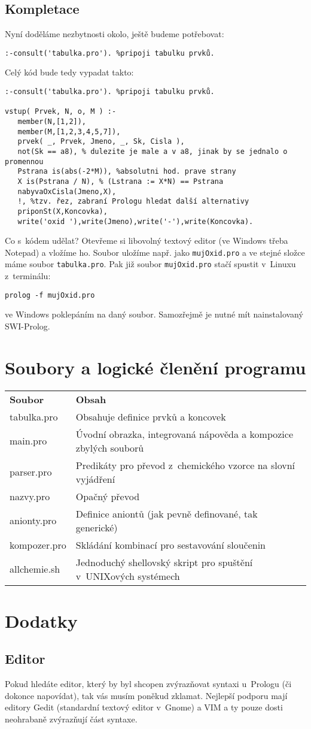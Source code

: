 \documentclass[a4paper]{article}
\begin{document}
\subsection{Kompletace}
Nyní doděláme nezbytnosti okolo, ještě budeme potřebovat:
\begin{verbatim}
:-consult('tabulka.pro'). %pripoji tabulku prvků.
\end{verbatim}
Celý kód bude tedy vypadat takto:
\begin{verbatim}
:-consult('tabulka.pro'). %pripoji tabulku prvků.

vstup( Prvek, N, o, M ) :-
   member(N,[1,2]),
   member(M,[1,2,3,4,5,7]),
   prvek( _, Prvek, Jmeno, _, Sk, Cisla ),
   not(Sk == a8), % dulezite je male a v a8, jinak by se jednalo o promennou
   Pstrana is(abs(-2*M)), %absolutni hod. prave strany
   X is(Pstrana / N), % (Lstrana := X*N) == Pstrana
   nabyvaOxCisla(Jmeno,X),
   !, %tzv. řez, zabraní Prologu hledat další alternativy
   priponSt(X,Koncovka), 
   write('oxid '),write(Jmeno),write('-'),write(Koncovka).
\end{verbatim}

Co s~kódem udělat? Otevřeme si libovolný textový editor (ve Windows třeba Notepad)
a vložíme ho. Soubor uložíme např. jako \texttt{mujOxid.pro} a ve stejné složce máme
soubor \texttt{tabulka.pro}. Pak již soubor \texttt{mujOxid.pro} stačí spustit v~Linuxu
z~terminálu:
\begin{verbatim}
prolog -f mujOxid.pro
\end{verbatim}
ve Windows poklepáním na daný soubor. Samozřejmě je nutné mít nainstalovaný SWI-Prolog.

\section{Soubory a logické členění programu}
\begin{tabular}{l p{7cm}}
\textbf{Soubor} & \textbf{Obsah} \\
tabulka.pro & Obsahuje definice prvků a koncovek\\
main.pro & Úvodní obrazka, integrovaná nápověda a kompozice zbylých souborů\\
parser.pro & Predikáty pro převod z~chemického vzorce na slovní vyjádření\\
nazvy.pro & Opačný převod\\
anionty.pro & Definice aniontů (jak pevně definované, tak generické)\\
kompozer.pro & Skládání kombinací pro sestavování sloučenin\\
allchemie.sh & Jednoduchý shellovský skript pro spuštění v~UNIXových systémech\\
\end{tabular}

\section{Dodatky}
\subsection{Editor}
Pokud hledáte editor, který by byl shcopen zvýrazňovat syntaxi u~Prologu (či dokonce napovídat), 
tak vás musím poněkud zklamat. Nejlepší podporu mají editory Gedit (standardní textový editor v~Gnome)
a VIM a ty pouze dosti neohrabaně zvýrazňují část syntaxe.
\end{document}
